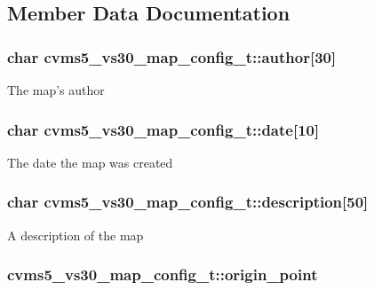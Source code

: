 \subsection{Member Data Documentation}
\hypertarget{structcvms5__vs30__map__config__t_a5bdb44f5fb4330604eaed53b66234d91}{
\subsubsection[{author}]{\setlength{\rightskip}{0pt plus 5cm}char cvms5\+\_\+vs30\+\_\+map\+\_\+config\+\_\+t\+::author\mbox{[}30\mbox{]}}}\label{structcvms5__vs30__map__config__t_a5bdb44f5fb4330604eaed53b66234d91}
The map's author \hypertarget{structcvms5__vs30__map__config__t_ac6c3bc1021b77a9b17c4786288a54e4a}{
\subsubsection[{date}]{\setlength{\rightskip}{0pt plus 5cm}char cvms5\+\_\+vs30\+\_\+map\+\_\+config\+\_\+t\+::date\mbox{[}10\mbox{]}}}\label{structcvms5__vs30__map__config__t_ac6c3bc1021b77a9b17c4786288a54e4a}
The date the map was created \hypertarget{structcvms5__vs30__map__config__t_a12be3490a8d3d89d49aff97b3660eb09}{
\subsubsection[{description}]{\setlength{\rightskip}{0pt plus 5cm}char cvms5\+\_\+vs30\+\_\+map\+\_\+config\+\_\+t\+::description\mbox{[}50\mbox{]}}}\label{structcvms5__vs30__map__config__t_a12be3490a8d3d89d49aff97b3660eb09}
A description of the map \hypertarget{structcvms5__vs30__map__config__t_af7d7654d3387586f67b6e7f3a2c5567d}{
\subsubsection[{origin\+\_\+point}]{ cvms5\+\_\+vs30\+\_\+map\+\_\+config\+\_\+t\+::origin\+\_\+point}}\label{structcvms5__vs30__map__config__t_af7d7654d3387586f67b6e7f3a2c5567d}
